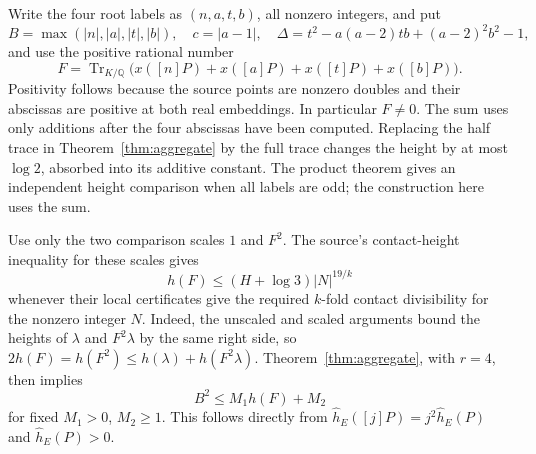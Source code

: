 \documentclass[11pt,a4paper]{article}
\newcommand{\Q}{\mathbb Q}\newcommand{\Z}{\mathbb Z}
\DeclareMathOperator{\Tr}{Tr}
\begin{document}
Write the four root labels as $(n,a,t,b)$, all nonzero integers, and put
\[
 B=\max(|n|,|a|,|t|,|b|),\quad c=|a-1|,
 \quad\Delta=t^2-a(a-2)tb+(a-2)^2b^2-1,
\]
and use the positive rational number
\[
 F=\Tr_{K/\Q}
       \bigl(x([n]P)+x([a]P)+x([t]P)+x([b]P)\bigr).
\]
Positivity follows because the source points are nonzero
 doubles and their abscissas are positive at both real
embeddings. In particular $F\ne0$. The sum uses only additions
after the four abscissas have been computed. Replacing the
half trace in Theorem~\ref{thm:aggregate} by the full trace
changes the height by at most $\log 2$, absorbed into its
additive constant. The product theorem gives an independent
height comparison when all labels are odd; the construction
here uses the sum.

Use only the two comparison scales $1$ and $F^2$. The
source's contact-height inequality for these scales gives
\begin{equation}\label{eq:two-scales}
 h(F)\le(H+\log3)|N|^{19/k}
\end{equation}
whenever their local certificates give the required
$k$-fold contact divisibility for the nonzero integer $N$.
Indeed, the unscaled and scaled arguments bound the heights
of $\lambda$ and $F^2\lambda$ by the same right side, so
$2h(F)=h(F^2)\le h(\lambda)+h(F^2\lambda)$.
Theorem~\ref{thm:aggregate}, with $r=4$, then implies
\begin{equation}\label{eq:B-height}
 B^2\le M_1 h(F)+M_2
\end{equation}
for fixed $M_1>0$, $M_2\ge1$. This follows directly from
$\widehat h_E([j]P)=j^2\widehat h_E(P)$ and
$\widehat h_E(P)>0$.
\end{document}
